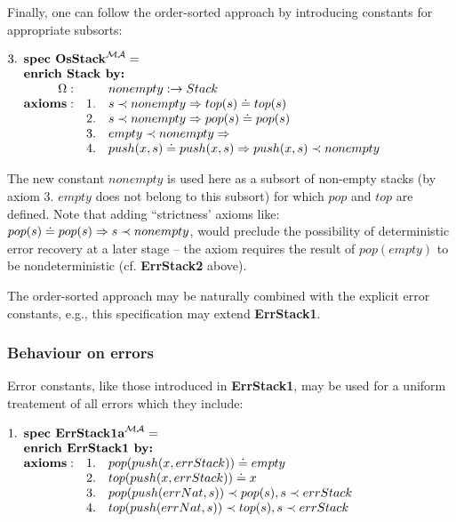 \documentclass[10pt]{article}
\begin{document}
Finally, one can follow the order-sorted approach by introducing constants for
appropriate subsorts:
\vspace*{1ex}

\( 
3. \spec{
	\tit{\mbox{\bf spec\ OsStack}^{\inst{MA}}=} \\
	\tit{\mbox{\bf enrich\ Stack\  by:}} \\
	    	\Ops:	&& nonempty: \to Stack\\
	 	{\bf axioms:}
			&1.& s \prec nonempty \To top(s) \eleq top(s)\\
			&2.& s \prec nonempty \To pop(s) \eleq pop(s)\\
			&3.& empty \prec nonempty \To	\\
			&4.& push(x,s)\eleq push(x,s) \To push(x,s)\prec nonempty
}
\)

\noindent
The new constant $nonempty$ is used here as a subsort of non-empty stacks (by
axiom 3. $empty$ does not belong to this subsort) for
which $pop$ and $top$ are defined. Note that adding ``strictness' axioms like:
$pop(s)\mathrel{\dot{=} } pop(s)\Rightarrow s\prec nonempty$, would preclude the possibility of
deterministic error recovery at a later stage -- the axiom requires the result
of $pop(empty)$ to be nondeterministic (cf. {\bf ErrStack2} above).

The order-sorted approach may be naturally combined with the explicit error
constants, e.g., this specification may extend {\bf ErrStack1}.


\subsubsection{Behaviour on errors}\label{subsub:er3}
Error constants, like those introduced in {\bf ErrStack1}, may be used for a
uniform treatement of all errors which they include: \vspace*{1ex}

\(
1. \spec{	\tit{\mbox{\bf spec\ ErrStack1a}^{\inst{MA}}=} \\
	\tit{\mbox{\bf enrich\ ErrStack1\  by:}} \\
	 	{\bf axioms:}
			&1.& pop(push(x,errStack))\eleq empty \\
			&2.& top(push(x,errStack))\eleq x \\
			&3.& pop(push(errNat,s))\prec pop(s), s\prec errStack \\
			&4.& top(push(errNat,s))\prec top(s), s\prec errStack 
}
\) %
\end{document}
